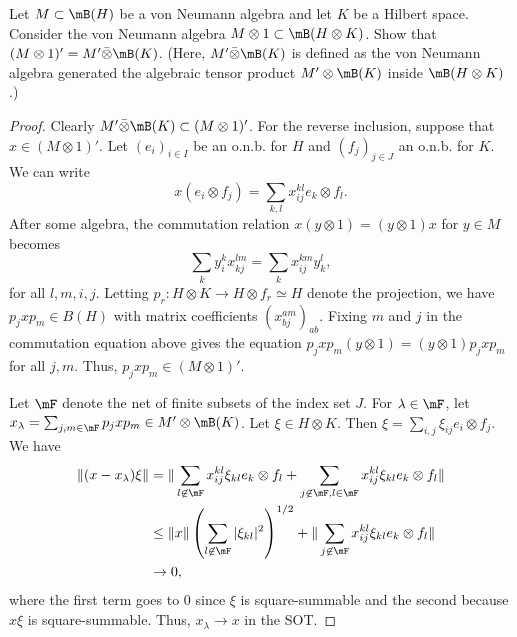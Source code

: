 \documentclass{article}
\begin{document}
 Let $M \subset \mB(H)$ be a von Neumann algebra and let $K$ be a Hilbert space. Consider the von
Neumann algebra $M \otimes 1 \subset \mB(H \otimes K)$. Show that $(M \otimes 1)' = M' \bar{\otimes} \mB(K)$.
(Here, $M' \bar{\otimes} \mB(K)$ is defined as the von Neumann algebra generated the algebraic
tensor product $M' \otimes \mB(K)$ inside $\mB(H \otimes K)$.)
\begin{proof}
  Clearly $M' \bar\otimes \mB(K) \subset (M \otimes 1)'$.  For the reverse inclusion, suppose that $x \in (M \otimes 1)'$.
  Let $(e_i)_{i \in I}$ be an o.n.b. for $H$ and $(f_j)_{j \in J}$ an o.n.b. for $K$.  We can write
  $$x (e_i \otimes f_j) = \sum_{k,l} x^{kl}_{ij} e_k \otimes f_l.$$
  After some algebra, the commutation relation $x (y \otimes 1) = (y \otimes 1) x$ for $y \in M$ becomes
  $$\sum_k y_i^k x^{lm}_{kj} = \sum_k x_{ij}^{km} y^l_k,$$
  for all $l,m,i,j$.   Letting $p_r: H \otimes K \to H \otimes f_r \simeq H$ denote the projection, we have
  $p_j x p_m \in B(H)$ with matrix coefficients $(x^{a m}_{b j})_{ab}$.  Fixing $m$ and $j$ in the commutation equation above
  gives the equation $p_j x p_m (y \otimes 1) = (y \otimes 1) p_j x p_m$ for all $j,m$.  Thus, $p_j x p_m \in (M \otimes 1)'$.

  Let $\mF$ denote the net of finite subsets of the index set $J$.  For $\lambda \in \mF$, let
  $x_\lambda = \sum_{j,m \in \mF} p_j x p_m \in M' \otimes \mB(K)$.  Let $\xi \in H \otimes K$.
  Then $\xi = \sum_{i,j} \xi_{ij} e_i \otimes f_j$.  We have
  \begin{align*}
    \|(x - x_\lambda) \xi \| & = \| \sum_{l \not\in \mF} x^{kl}_{ij} \xi_{kl} e_k \otimes f_l
    + \sum_{j \not \in \mF, l \in \mF} x^{kl}_{ij} \xi_{kl} e_k \otimes f_l  \| \\
    & \le \|x\|  \left( \sum_{l \not\in \mF} |\xi_{kl}|^2 \right)^{1/2} + \| \sum_{j \not \in \mF} x^{kl}_{ij} \xi_{kl} e_k \otimes f_l  \| \\
    & \to 0,
  \end{align*}
  where the first term goes to 0 since $\xi$ is square-summable and the second because $x \xi$ is square-summable.
  Thus, $x_\lambda \to x$ in the SOT. 
\end{proof}
\end{document}
